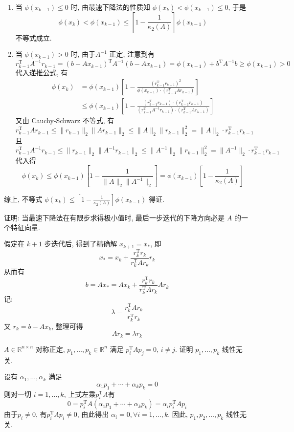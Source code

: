 \documentclass[12pt, answers]{exam}     %
\newcommand{\R}{\mathbb{R}}
\newcommand{\T}{\mathrm{T}}
\begin{document}
\begin{questions}
\begin{solution}
\begin{enumerate}
    \item 当 $\phi(x_{k-1}) \leq 0$ 时, 
    由最速下降法的性质知 $\phi(x_k) < \phi(x_{k-1}) \leq 0$, 于是
    \[
    \phi(x_k) < \phi(x_{k-1}) \le \left[1 - \frac{1}{\kappa_2(A)}\right] \phi(x_{k-1})
    \]
    不等式成立. 

    \item 当 $\phi(x_{k-1}) > 0$ 时, 
    由于$A^{-1}$ 正定, 注意到有
    \[
    r_{k-1}^{\T} A^{-1} r_{k-1} = (b - A x_{k-1})^{\T} A^{-1} (b - A x_{k-1}) = \phi(x_{k-1}) + b^{\T} A^{-1} b \geq \phi(x_{k-1}) > 0
    \]
    代入递推公式, 有
    \begin{align*}
    \phi(x_k) &= \phi(x_{k-1}) \left[ 1 - \frac{(r_{k-1}^{\T} r_{k-1})^2}{\phi(x_{k-1}) \cdot (r_{k-1}^{\T} A r_{k-1})} \right] \\
    &\leq \phi(x_{k-1}) \left[ 1 - \frac{(r_{k-1}^{\T} r_{k-1}) \cdot (r_{k-1}^{\T} r_{k-1})}{(r_{k-1}^{\T} A^{-1} r_{k-1}) \cdot (r_{k-1}^{\T} A r_{k-1})} \right]
    \end{align*}
    又由 Cauchy-Schwarz 不等式, 有
    \[
    r_{k-1}^{\T} A r_{k-1} \leq \|r_{k-1}\|_2 \|A r_{k-1}\|_2 \leq \|A\|_2 \|r_{k-1}\|_2^2 = \|A\|_2 \cdot r_{k-1}^{\T} r_{k-1}
    \]
    且
    \[
    r_{k-1}^{\T} A^{-1} r_{k-1} \leq \|r_{k-1}\|_2 \|A^{-1} r_{k-1}\|_2 \leq \|A^{-1}\|_2 \|r_{k-1}\|_2^2 = \|A^{-1}\|_2 \cdot r_{k-1}^{\T} r_{k-1}
    \]
    代入得
    \[
    \phi(x_k) \leq \phi(x_{k-1}) \left[ 1 - \frac{1}{\|A\|_2 \|A^{-1}\|_2} \right] = \phi(x_{k-1}) \left[ 1 - \frac{1}{\kappa_2(A)} \right]
    \]
\end{enumerate}
综上, 不等式 $\phi(x_k) \leq \left[1 - \frac{1}{\kappa_2(A)}\right] \phi(x_{k-1})$ 得证. 

\end{solution}


\question{}证明: 当最速下降法在有限步求得极小值时, 最后一步迭代的下降方向必是 \( A \) 的一个特征向量. 

\begin{solution}
假定在 \( k+1 \) 步迭代后, 得到了精确解 \( x_{k+1} = x_* \), 即
\[ x_* = x_k + \frac{r_k^{\T} r_k}{r_k^{\T} A r_k} r_k \]
从而有
\[ b = A x_* = A x_k + \frac{r_k^{\T} r_k}{r_k^{\T} A r_k} A r_k \]
记:
\[ \lambda = \frac{r_k^{\T} A r_k}{r_k^{\T} r_k} \]
又 $ r_k = b - A x_k $, 整理可得
\[ A r_k = \lambda r_k \]
\end{solution}

\question{}
 \( A \in \R^{n \times n} \) 对称正定, \( p_1, \ldots, p_k \in \R^n \) 满足 \( p_i^{\T} A p_j = 0 \), \( i \neq j \). 证明 \( p_1, \ldots, p_k \) 线性无关. 
\begin{solution}
设有 \( \alpha_1, \ldots, \alpha_k \) 满足
\[
\alpha_1 p_1 + \cdots + \alpha_k p_k = 0
\]
则对一切 \( i = 1, \ldots, k \), 上式左乘\(p_i^{\T} A\)有
\[
0 = p_i^{\T} A (\alpha_1 p_1 + \cdots + \alpha_k p_k) = \alpha_i p_i^{\T} A p_i
\]
由于\(p_i \ne 0\), 有\( p_i^{\T} A p_i \neq 0 \), 由此得出 \( \alpha_i = 0, \forall i = 1, \ldots, k \). 因此, \( p_1, p_2, \ldots, p_k \) 线性无关. 
\end{solution}


\end{questions}
\end{document}
